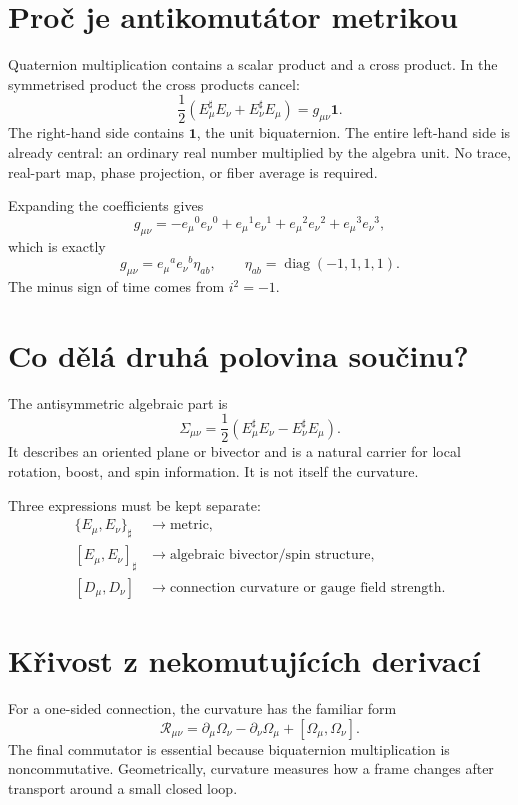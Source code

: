 \section{Proč je antikomutátor metrikou}
Quaternion multiplication contains a scalar product and a cross product.  In
the symmetrised product the cross products cancel:
\[
 \boxed{
 \frac12\left(E_\mu^\sharp E_\nu+E_\nu^\sharp E_\mu\right)
 =g_{\mu\nu}\mathbf1.}
\]
The right-hand side contains $\mathbf1$, the unit biquaternion.  The entire
left-hand side is already central: an ordinary real number multiplied by the
algebra unit.  No trace, real-part map, phase projection, or fiber average is
required.

Expanding the coefficients gives
\[
 g_{\mu\nu}
 =-e_\mu{}^0e_\nu{}^0+
  e_\mu{}^1e_\nu{}^1+
  e_\mu{}^2e_\nu{}^2+
  e_\mu{}^3e_\nu{}^3,
\]
which is exactly
\[
 g_{\mu\nu}=e_\mu{}^a e_\nu{}^b\eta_{ab},
 \qquad \eta_{ab}=\operatorname{diag}(-1,1,1,1).
\]
The minus sign of time comes from $i^2=-1$.

\section{Co dělá druhá polovina součinu?}
The antisymmetric algebraic part is
\[
 \Sigma_{\mu\nu}
 =\frac12\left(E_\mu^\sharp E_\nu-E_\nu^\sharp E_\mu\right).
\]
It describes an oriented plane or bivector and is a natural carrier for local
rotation, boost, and spin information.  It is not itself the curvature.

Three expressions must be kept separate:
\begin{align*}
 \{E_\mu,E_\nu\}_\sharp
 &\longrightarrow \text{metric},\\
 [E_\mu,E_\nu]_\sharp
 &\longrightarrow \text{algebraic bivector/spin structure},\\
 [D_\mu,D_\nu]
 &\longrightarrow \text{connection curvature or gauge field strength}.
\end{align*}

\section{Křivost z nekomutujících derivací}
For a one-sided connection, the curvature has the familiar form
\[
 \mathcal R_{\mu\nu}
 =\partial_\mu\Omega_\nu-\partial_\nu\Omega_\mu
  +[\Omega_\mu,\Omega_\nu].
\]
The final commutator is essential because biquaternion multiplication is
noncommutative.  Geometrically, curvature measures how a frame changes after
transport around a small closed loop.

